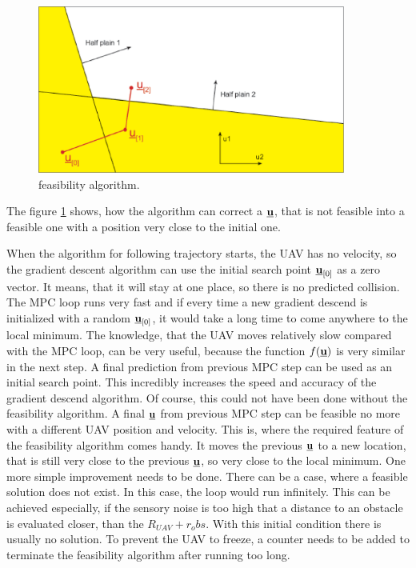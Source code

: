 \documentclass{article}
\newcommand{\uvec}{\textbf{\underline{u}}}
\newcommand{\macf}{f(\uvec)}
\begin{document}
\begin{figure}[!ht]
\includegraphics[width=0.9\textwidth]{fig/feasibility_paint.eps}
\caption{feasibility algorithm.}
\label{fig:feasibility_algorithm}
\end{figure}


The figure \ref{fig:feasibility_algorithm} shows, how the algorithm can correct a $\uvec$, that is not feasible into a feasible one with a position very close to the initial one. 

When the algorithm for following trajectory starts, the UAV has no velocity, so the gradient descent algorithm can use the initial search point $\uvec_{[0]}$ as a zero vector. It means, that it will stay at one place, so there is no predicted collision. The MPC loop runs very fast and if every time a new gradient descend is initialized with a random $\uvec_{[0]}$, it would take a long time to come anywhere to the local minimum. The knowledge, that the UAV moves relatively slow compared with the MPC loop, can be very useful, because the function $\macf$ is very similar in the next step. A final prediction from previous MPC step can be used as an initial search point. This incredibly increases the speed and accuracy of the gradient descend algorithm. Of course, this could not have been done without the feasibility algorithm. A final $\uvec$ from previous MPC step can be feasible no more with a different UAV position and velocity. This is, where the required feature of the feasibility algorithm comes handy. It moves the previous $\uvec$ to a new location, that is still very close to the previous $\uvec$, so very close to the local minimum. 
One more simple improvement needs to be done. There can be a case, where a feasible solution does not exist. In this case, the loop would run infinitely. This can be achieved especially, if the sensory noise is too high that a distance to an obstacle is evaluated closer, than the $R_{UAV} + r_obs$. With this initial condition there is usually no solution. To prevent the UAV to freeze, a counter needs to be added to terminate the feasibility algorithm after running too long.
\end{document}
